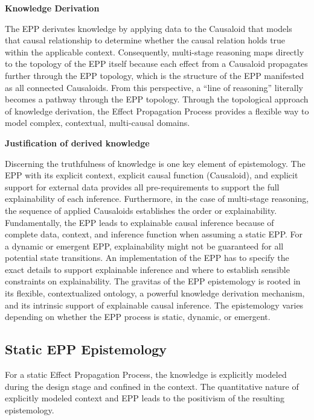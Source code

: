 \documentclass{article}
\begin{document}
\textbf{Knowledge Derivation}

The EPP derivates knowledge by applying data to the Causaloid that models that causal relationship to determine whether the causal relation holds true within the applicable context. Consequently, multi-stage reasoning maps directly to the topology of the EPP itself because each effect from a Causaloid propagates further through the EPP topology, which is the structure of the EPP manifested as all connected Causaloids.
From this perspective, a “line of reasoning” literally becomes a pathway through the EPP topology.
Through the topological approach of knowledge derivation, the Effect Propagation Process provides a flexible way to model complex, contextual, multi-causal domains.

\newpage

\textbf{Justification of derived knowledge}

Discerning the truthfulness of knowledge is one key element of epistemology. The EPP with its explicit context, explicit causal function (Causaloid), and explicit support for external data provides all pre-requirements to support the full explainability of each inference. Furthermore, in the case of multi-stage reasoning, the sequence of applied Causaloids establishes the order or explainability.
Fundamentally, the EPP leads to explainable causal inference because of complete data, context, and inference function when assuming a static EPP. For a dynamic or emergent EPP, explainability might not be guaranteed for all potential state transitions. An implementation of the EPP has to specify the exact details to support explainable inference and where to establish sensible constraints on explainability. The gravitas of the EPP epistemology is rooted in its flexible, contextualized ontology, a powerful knowledge derivation mechanism, and its intrinsic support of explainable causal inference. The epistemology varies depending on whether the EPP process is static, dynamic, or emergent.

\subsection{Static EPP Epistemology}
\label{subsec:Static_EPP}

For a static Effect Propagation Process, the knowledge is explicitly modeled during the design stage and confined in the context. The quantitative nature of explicitly modeled context and EPP leads to the positivism of the resulting epistemology.
\end{document}
